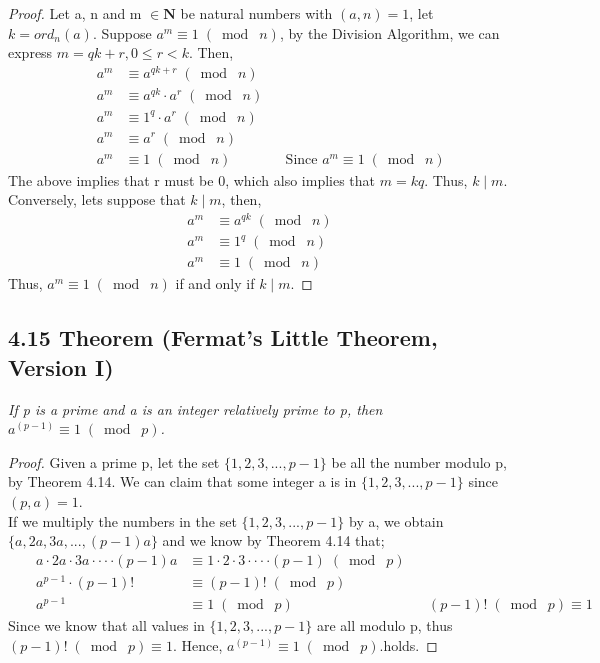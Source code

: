 \documentclass{article}
\begin{document}
\begin{proof}
Let a, n and m $\in \mathbf{N}$ be natural numbers with $(a, n) = 1$, let $k = ord_n(a)$. Suppose $a^m \equiv 1 \;(\bmod\; n)$, by the Division Algorithm, we can express $m = qk + r, 0 \leq r < k$. Then, 
\begin{align*}
    && a^m &\equiv a^{qk+r} \;(\bmod\; n)&&\\
    && a^m &\equiv a^{qk} \cdot a^r \;(\bmod\; n)&&\\
    && a^m &\equiv 1^q \cdot a^r \;(\bmod\; n)&&\\
    && a^m &\equiv a^r \;(\bmod\; n)&&\\
    && a^m &\equiv 1 \;(\bmod\; n)&& \text{Since $a^m \equiv 1 \;(\bmod\; n)$}
\end{align*}
The above implies that r must be 0, which also implies that $m = kq$. Thus, $k \mid m$.
Conversely, lets suppose that $k \mid m$, then,
\begin{align*}
    && a^m &\equiv a^{qk} \;(\bmod\; n)&&\\
    && a^m &\equiv 1^q \;(\bmod\; n)&&\\
    && a^m &\equiv 1 \;(\bmod\; n)&&
\end{align*}
Thus, $a^m \equiv 1 \;(\bmod\; n)$ if and only if $k \mid m$.
\end{proof}

\subsection*{4.15 Theorem (Fermat's Little Theorem, Version I)} 
\quad \textit{If p is a prime and a is an integer relatively prime to p, then $a^{(p-1)} \equiv 1 \;(\bmod\; p)$.}

\begin{proof}
Given a prime p, let the set $\{1,2,3,...,p-1\}$ be all the number modulo p, by Theorem 4.14. We can claim that some integer a is in $\{1,2,3,...,p-1\}$ since $(p, a) = 1$.\\
If we multiply the numbers in the set $\{1,2,3,...,p-1\}$ by a, we obtain $\{a,2a,3a,...,(p-1)a\}$ and we know by Theorem 4.14 that;
\begin{align*}
    &&a \cdot 2a \cdot 3a \cdot \cdot \cdot \cdot (p-1)a &\equiv 1 \cdot 2 \cdot 3 \cdot \cdot \cdot \cdot (p-1) \;(\bmod\; p)&&\\
    &&a^{p-1} \cdot (p-1)! &\equiv (p-1)! \;(\bmod\; p)&&\\
    &&a^{p-1} &\equiv 1 \;(\bmod\; p)&& (p-1)! \;(\bmod\; p) \equiv 1
\end{align*}
Since we know that all values in $\{1,2,3,...,p-1\}$ are all modulo p, thus $(p-1)! \;(\bmod\; p) \equiv 1$. Hence, $a^{(p-1)} \equiv 1 \;(\bmod\; p)$.holds.
\end{proof}
\end{document}
